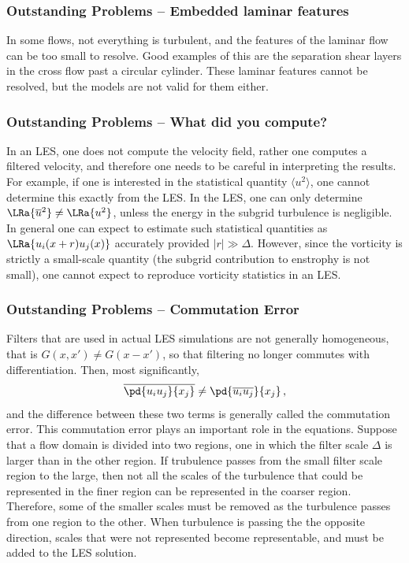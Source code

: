 \documentclass{beamer}
\begin{document}
\begin{frame}\frametitle{Outstanding Problems -- Embedded laminar features}
In some flows, not everything is turbulent, and the features of the laminar
flow can be too small to resolve. Good examples of this are the separation
shear layers in the cross flow past a circular cylinder. These laminar
features cannot be resolved, but the models are not valid for them either.
\end{frame}

\begin{frame}\frametitle{Outstanding Problems -- What did you compute?}
In an LES, one does not compute the velocity field, rather one computes a
filtered velocity, and therefore one needs to be careful in interpreting the
results. For example, if one is interested in the statistical quantity
$\langle u^2\rangle$, one cannot determine this exactly from the LES. In the
LES, one can only determine $\LRa{\overline{u}^2}\neq\LRa{u^2}$, unless the
energy in the subgrid turbulence is negligible. In general one can expect to
estimate such statistical quantities as $\LRa{u_i(x+r)u_j(x)}$ accurately
provided $|r|\gg\Delta$. However, since the vorticity is strictly a
small-scale quantity (the subgrid contribution to enstrophy is not small), one
cannot expect to reproduce vorticity statistics in an LES.
\end{frame}

\begin{frame}\frametitle{Outstanding Problems -- Commutation Error}
Filters that are used in actual LES simulations are not generally homogeneous,
that is $G(x,x')\neq G(x-x')$, so that filtering no longer commutes with
differentiation. Then, most significantly,
\[
\overline{\pd{u_iu_j}{x_j}}\neq\pd{\overline{u_iu_j}}{x_j}\,,
\]
and the difference between these two terms is generally called the commutation
error. This commutation error plays an important role in the equations.
Suppose that a flow domain is divided into two regions, one in which the
filter scale $\Delta$ is larger than in the other region. If trubulence passes
from the small filter scale region to the large, then not all the scales of
the turbulence that could be represented in the finer region can be
represented in the coarser region. Therefore, some of the smaller scales must
be removed as the turbulence passes from one region to the other. When
turbulence is passing the the opposite direction, scales that were not
represented become representable, and must be added to the LES solution. 
\end{frame}
\end{document}
